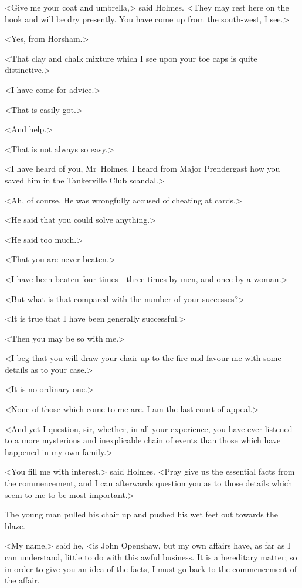 <Give me your coat and umbrella,> said Holmes. <They may rest here on the hook and will be dry presently. You have come up from the south-west, I see.>

<Yes, from Horsham.>

<That clay and chalk mixture which I see upon your toe caps is quite distinctive.>

<I have come for advice.>

<That is easily got.>

<And help.>

<That is not always so easy.>

<I have heard of you, Mr~Holmes. I heard from Major Prendergast how you saved him in the Tankerville Club scandal.>

<Ah, of course. He was wrongfully accused of cheating at cards.>

<He said that you could solve anything.>

<He said too much.>

<That you are never beaten.>

<I have been beaten four times—three times by men, and once by a woman.>

<But what is that compared with the number of your successes?>

<It is true that I have been generally successful.>

<Then you may be so with me.>

<I beg that you will draw your chair up to the fire and favour me with some details as to your case.>

<It is no ordinary one.>

<None of those which come to me are. I am the last court of appeal.>

<And yet I question, sir, whether, in all your experience, you have ever listened to a more mysterious and inexplicable chain of events than those which have happened in my own family.>

<You fill me with interest,> said Holmes. <Pray give us the essential facts from the commencement, and I can afterwards question you as to those details which seem to me to be most important.>

The young man pulled his chair up and pushed his wet feet out towards the blaze.

<My name,> said he, <is John Openshaw, but my own affairs have, as far as I can understand, little to do with this awful business. It is a hereditary matter; so in order to give you an idea of the facts, I must go back to the commencement of the affair.


